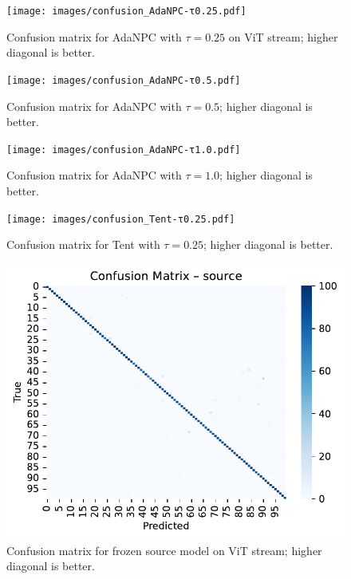 \documentclass{article} %
\begin{document}
\begin{figure}[H]
  \centering
  \texttt{[image: images/confusion\_AdaNPC-τ0.25.pdf]}
  \caption{Confusion matrix for AdaNPC with \(\tau = 0.25\) on ViT stream; higher diagonal is better.}
\end{figure}
\begin{figure}[H]
  \centering
  \texttt{[image: images/confusion\_AdaNPC-τ0.5.pdf]}
  \caption{Confusion matrix for AdaNPC with \(\tau = 0.5\); higher diagonal is better.}
\end{figure}
\begin{figure}[H]
  \centering
  \texttt{[image: images/confusion\_AdaNPC-τ1.0.pdf]}
  \caption{Confusion matrix for AdaNPC with \(\tau = 1.0\); higher diagonal is better.}
\end{figure}
\begin{figure}[H]
  \centering
  \texttt{[image: images/confusion\_Tent-τ0.25.pdf]}
  \caption{Confusion matrix for Tent with \(\tau = 0.25\); higher diagonal is better.}
\end{figure}
\begin{figure}[H]
  \centering
  \includegraphics[width=0.7\linewidth]{images/confusion_source.pdf}
  \caption{Confusion matrix for frozen source model on ViT stream; higher diagonal is better.}
\end{figure}
\end{document}
